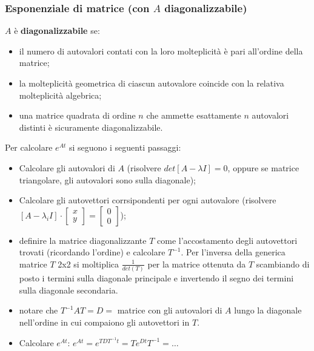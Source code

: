 \begin{landscape}
\begin{multicols*}{3}
    \subsubsection*{Esponenziale di matrice (con $A$ diagonalizzabile)}
    $A$ è \textbf{diagonalizzabile} se:
    \begin{itemize}
        \item il numero di autovalori contati con la loro molteplicità è pari all’ordine della matrice;
        \item la molteplicità geometrica di ciascun autovalore coincide con la relativa molteplicità algebrica;
        \item una matrice quadrata di ordine $n$ che ammette esattamente $n$ autovalori distinti è sicuramente diagonalizzabile.
    \end{itemize}
    Per calcolare $e^{At}$ si seguono i seguenti passaggi:
    \begin{itemize}
        \item Calcolare gli autovalori di $A$ (risolvere $det[A-\lambda I] = 0$, oppure se matrice triangolare, gli autovalori sono sulla diagonale);
        \item Calcolare gli autovettori corrsipondenti per ogni autovalore \newline (risolvere $[A-\lambda_i I] \cdot \left[\begin{matrix}
            x\\y
        \end{matrix}\right] = \left[\begin{matrix}
            0\\0
        \end{matrix}\right]$);
        \item definire la matrice diagonalizzante $T$ come l'accostamento degli autovettori trovati (ricordando l'ordine) e calcolare $T^{-1}$. Per l’inversa della generica matrice $T$ 2x2 si moltiplica $\frac{1}{det(T)}$ per la matrice ottenuta da $T$ scambiando di posto i termini sulla diagonale principale e invertendo
        il segno dei termini sulla diagonale secondaria.
        \item notare che $T^{-1} A T = D = $ matrice con gli autovalori di $A$ lungo la diagonale nell'ordine in cui compaiono gli autovettori in $T$.
        \item Calcolare $e^{At}$:\newline
        $e^{At} = e^{TDT^{-1} t} = T e^{Dt} T^{-1} = \dots$
    \end{itemize}

\end{multicols*}
\end{landscape}
